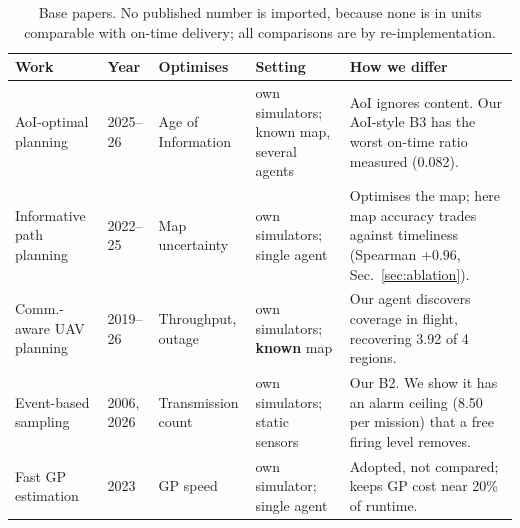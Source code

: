\documentclass[pdflatex,sn-mathphys-num,iicol]{sn-jnl}
\theoremstyle{thmstyleone}
\theoremstyle{thmstyletwo}
\theoremstyle{thmstylethree}
\begin{document}
\begin{table}[t]
\caption{Base papers. No published number is imported, because none is in units
comparable with on-time delivery; all comparisons are by re-implementation.}
\label{tab:related}
\centering
\scriptsize
\begin{tabular}{@{}P{2.6cm}P{1.0cm}P{2.0cm}P{3.0cm}P{5.6cm}@{}}
\toprule
\textbf{Work} & \textbf{Year} & \textbf{Optimises} & \textbf{Setting} &
\textbf{How we differ} \\
\midrule
AoI-optimal planning~\cite{xieAoIoptimalPathPlanning2025,
AoIOptimalMultiAAVEnabledISAC, fidler2DAoIAgeofInformationDistributed2026} & 2025--26 &
Age of Information & own simulators; known map, several agents &
AoI ignores content. Our AoI-style B3 has the worst on-time ratio measured (0.082). \\
Informative path planning~\cite{maAdaptiveInformativePath2025,
blanchardInformativePathPlanning2022} & 2022--25 & Map uncertainty & own simulators;
single agent & Optimises the map; here map accuracy trades against timeliness
(Spearman $+0.96$, Sec.~\ref{sec:ablation}). \\
Comm.-aware UAV planning~\cite{mardaniCommunicationAwareUAVPath2019,
chuTrajectoryOptimizationResource2026, hayatMultiobjectiveDronePath2020} & 2019--26 &
Throughput, outage & own simulators; \textbf{known} map &
Our agent discovers coverage in flight, recovering 3.92 of 4 regions. \\
Event-based sampling~\cite{miskowiczSendOnDelta2006,
hakandurakEfficientEventBasedSampling2026} & 2006, 2026 & Transmission count & own
simulators; static sensors &
Our B2. We show it has an alarm ceiling (8.50 per mission) that a free firing level
removes. \\
Fast GP estimation~\cite{munozGaussianProcessesFast2023} & 2023 & GP speed &
own simulator; single agent & Adopted, not compared; keeps GP cost near 20\% of runtime. \\
\bottomrule
\end{tabular}
\end{table}
\end{document}
